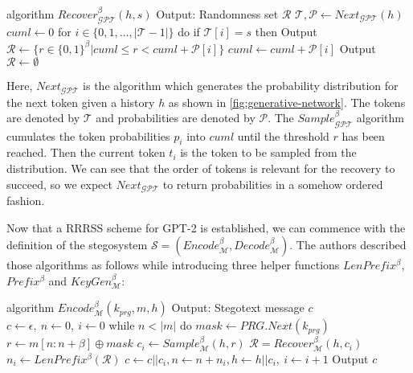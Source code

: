 \begin{Pseudocode}[caption={
RRRSS $Recover$ algorithm for GPT-2 \cite{Meteor2021}.
Given a history $h$ and a sample $s$, return a set of possible random values used to generate $s$ with history $h$.
}]
algorithm $Recover_{\mathcal{GPT}}^\beta(h, s)$
  Output: Randomness set $\mathcal{R}$
  $\mathcal{T}, \mathcal{P} \leftarrow Next_{\mathcal{GPT}}(h)$
  $cuml \leftarrow 0$
  for $i \in \{ 0, 1, \dots, | \mathcal{T} - 1 | \}$ do
    if $\mathcal{T}[i] = s$ then
      Output $\mathcal{R} \leftarrow \{ r \in \{ 0, 1\}^\beta | cuml \leq r < cuml + \mathcal{P}[i] \}$
    $cuml \leftarrow cuml + \mathcal{P}[i]$
  Output $\mathcal{R} \leftarrow \emptyset$
\end{Pseudocode}

Here, $Next_{\mathcal{GPT}}$ is the algorithm which generates the probability distribution for the next token given a history $h$ as shown in \autoref{fig:generative-network}.
The tokens are denoted by $\mathcal{T}$ and probabilities are denoted by $\mathcal{P}$.
The $Sample_{\mathcal{GPT}}^\beta$ algorithm cumulates the token probabilities $p_i$ into $cuml$ until the threshold $r$ has been reached.
Then the current token $t_i$ is the token to be sampled from the distribution.
We can see that the order of tokens is relevant for the recovery to succeed, so we expect $Next_{\mathcal{GPT}}$ to return probabilities in a somehow ordered fashion.

Now that a RRRSS scheme for GPT-2 is established, we can commence with the definition of the stegosystem $\mathcal{S} = \left( Encode_{\mathcal{M}}^\beta, Decode_{\mathcal{M}}^\beta \right)$.
The authors described those algorithms as follows while introducing three helper functions $LenPrefix^\beta$, $Prefix^\beta$ and $KeyGen_{\mathcal{M}}^\beta$:


\begin{Pseudocode}[caption={$Encode$ algorithm \cite{Meteor2021}}, label={alg:encode}]
algorithm $Encode_{\mathcal{M}}^\beta(k_{prg}, m, h)$
  Output: Stegotext message $c$
  $c \leftarrow \epsilon,~ n \leftarrow 0,~ i \leftarrow 0$
  while $n < |m|$ do
    $mask \leftarrow PRG.Next(k_{prg})$
    $r \leftarrow m[n:n+\beta] \oplus mask$
    $c_i \leftarrow Sample_{\mathcal{M}}^\beta(h, r)$
    $\mathcal{R} = Recover_{\mathcal{M}}^\beta(h, c_i)$
    $n_i \leftarrow LenPrefix^\beta(\mathcal{R})$
    $c \leftarrow c || c_i, n \leftarrow n+n_i, h \leftarrow h||c_i,~ i \leftarrow i + 1$
  Output $c$
\end{Pseudocode}

